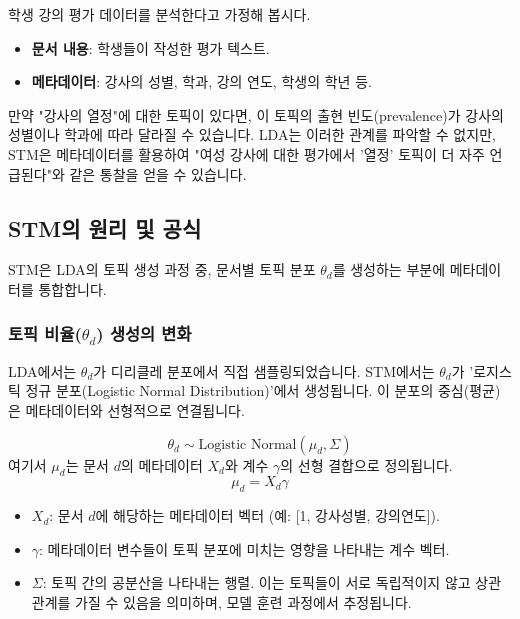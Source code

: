 \documentclass[11pt,a4paper]{article}
\theoremstyle{definition}
\begin{document}
\begin{tcolorbox}[example={메타데이터의 중요성}]
학생 강의 평가 데이터를 분석한다고 가정해 봅시다.
\begin{itemize}
    \item \textbf{문서 내용}: 학생들이 작성한 평가 텍스트.
    \item \textbf{메타데이터}: 강사의 성별, 학과, 강의 연도, 학생의 학년 등.
\end{itemize}
만약 "강사의 열정"에 대한 토픽이 있다면, 이 토픽의 출현 빈도(prevalence)가 강사의 성별이나 학과에 따라 달라질 수 있습니다. LDA는 이러한 관계를 파악할 수 없지만, STM은 메타데이터를 활용하여 "여성 강사에 대한 평가에서 '열정' 토픽이 더 자주 언급된다"와 같은 통찰을 얻을 수 있습니다.
\end{tcolorbox}

\subsection{STM의 원리 및 공식}
STM은 LDA의 토픽 생성 과정 중, 문서별 토픽 분포 $\theta_d$를 생성하는 부분에 메타데이터를 통합합니다.

\subsubsection{토픽 비율($\theta_d$) 생성의 변화}
LDA에서는 $\theta_d$가 디리클레 분포에서 직접 샘플링되었습니다. STM에서는 $\theta_d$가 '로지스틱 정규 분포(Logistic Normal Distribution)'에서 생성됩니다. 이 분포의 중심(평균)은 메타데이터와 선형적으로 연결됩니다.

\begin{equation*}
\theta_d \sim \text{Logistic Normal}(\mu_d, \Sigma)
\end{equation*}
여기서 $\mu_d$는 문서 $d$의 메타데이터 $X_d$와 계수 $\gamma$의 선형 결합으로 정의됩니다.
\begin{equation*}
\mu_d = X_d \gamma
\end{equation*}

\begin{itemize}
    \item \textbf{$X_d$}: 문서 $d$에 해당하는 메타데이터 벡터 (예: [1, 강사성별, 강의연도]).
    \item \textbf{$\gamma$}: 메타데이터 변수들이 토픽 분포에 미치는 영향을 나타내는 계수 벡터.
    \item \textbf{$\Sigma$}: 토픽 간의 공분산을 나타내는 행렬. 이는 토픽들이 서로 독립적이지 않고 상관관계를 가질 수 있음을 의미하며, 모델 훈련 과정에서 추정됩니다.
\end{itemize}
\end{document}
